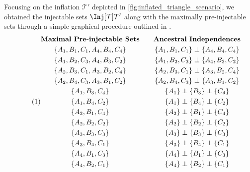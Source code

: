 \documentclass[aps, 10pt, english, twoside, pra, nofootinbib, longbibliography]{revtex4-1}
\theoremstyle{plain}
\theoremstyle{definition}
\theoremstyle{remark}
\newcommand{\ancestralindep}{\perp}
\newcommand{\ts}{\mathcal{T}}
\begin{document}
    Focusing on the inflation $\ts'$ depicted in \cref{fig:inflated_triangle_scenario}, we obtained the injectable sets $\Inj[\ts]{\ts'}$ along with the maximally pre-injectable sets through a simple graphical procedure outlined in \cite{Inflation}.
    \begin{equation*}
        \eq \label{eq:pre-injectable_triangle_scenario}
        \begin{gathered}
            \textbf{Maximal Pre-injectable Sets} \\
            \bc{A_1, B_1, C_1, A_4, B_4, C_4} \\
            \bc{A_1, B_2, C_3, A_4, B_3, C_2} \\
            \bc{A_2, B_3, C_1, A_3, B_2, C_4} \\
            \bc{A_2, B_4, C_3, A_3, B_1, C_2} \\
            \bc{A_1, B_3, C_4} \\
            \bc{A_1, B_4, C_2} \\
            \bc{A_2, B_1, C_4} \\
            \bc{A_2, B_2, C_2} \\
            \bc{A_3, B_3, C_3} \\
            \bc{A_3, B_4, C_1} \\
            \bc{A_4, B_1, C_3} \\
            \bc{A_4, B_2, C_1}
        \end{gathered}
        \qquad
        \begin{gathered}
            \textbf{Ancestral Independences} \\
            \bc{A_1, B_1, C_1} \ancestralindep \bc{A_4, B_4, C_4} \\
            \bc{A_1, B_2, C_3} \ancestralindep \bc{A_4, B_3, C_2} \\
            \bc{A_2, B_3, C_1} \ancestralindep \bc{A_3, B_2, C_4} \\
            \bc{A_2, B_4, C_3} \ancestralindep \bc{A_3, B_1, C_2} \\
            \bc{A_1} \ancestralindep \bc{B_3} \ancestralindep \bc{C_4} \\
            \bc{A_1} \ancestralindep \bc{B_4} \ancestralindep \bc{C_2} \\
            \bc{A_2} \ancestralindep \bc{B_1} \ancestralindep \bc{C_4} \\
            \bc{A_2} \ancestralindep \bc{B_2} \ancestralindep \bc{C_2} \\
            \bc{A_3} \ancestralindep \bc{B_3} \ancestralindep \bc{C_3} \\
            \bc{A_3} \ancestralindep \bc{B_4} \ancestralindep \bc{C_1} \\
            \bc{A_4} \ancestralindep \bc{B_1} \ancestralindep \bc{C_3} \\
            \bc{A_4} \ancestralindep \bc{B_2} \ancestralindep \bc{C_1}
        \end{gathered}
    \end{equation*}
\end{document}
